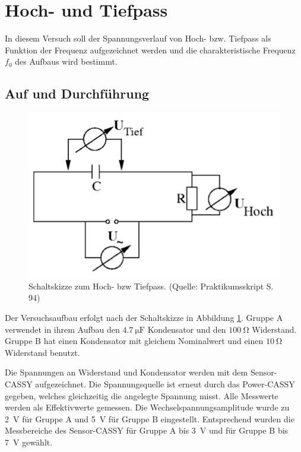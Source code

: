 \documentclass[12pt,a4paper]{article}
\begin{document}
\newpage
\section{Hoch- und Tiefpass}

In diesem Versuch soll der Spannungsverlauf von Hoch- bzw. Tiefpass als Funktion der Frequenz aufgezeichnet werden und die charakteristische Frequenz $f_0$  des Aufbaus wird bestimmt.

\subsection{Auf und Durchführung}

\begin{figure}
\centering
\includegraphics[scale=0.9]{Bilder/AufbauHochTief.png}
\caption{Schaltskizze zum Hoch- bzw Tiefpass. (Quelle: Praktikumsskript S. 94)}
\label{fig:AufbauHochTief}
\end{figure}

Der Versuchsaufbau erfolgt nach der Schaltskizze in Abbildung \ref{fig:AufbauHochTief}. 
Gruppe A verwendet in ihrem Aufbau den $\SI{4,7}{\micro \F}$ Kondensator und den $\SI{100}{\ohm}$ Widerstand. Gruppe B hat einen Kondensator mit gleichem Nominalwert und einen $\SI{10}{\ohm}$ Widerstand benutzt.


Die Spannungen an Widerstand und Kondensator
werden mit dem Sensor-CASSY aufgezeichnet. Die Spannungsquelle ist erneut durch das Power-CASSY gegeben, welches gleichzeitig die angelegte Spannung misst. Alle Messwerte werden als Effektivwerte gemessen. Die Wechselspannungsamplitude wurde zu \SI{2}{\V} für Gruppe A und \SI{5}{\V} für Gruppe B eingestellt. Entsprechend wurden die Messbereiche des Sensor-CASSY für Gruppe A bis \SI{3}{\V} und für Gruppe B bis \SI{7}{\V} gewählt.
\end{document}
